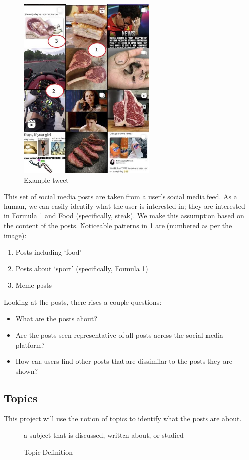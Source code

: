 \begin{figure}
    \centering
    \includegraphics[width=0.6\textwidth]{../images/tweet-example.png}
    \caption{Example tweet}
    \label{fig:motivation-example}
\end{figure}

This set of social media posts are taken from a user's social media feed. As a human, we can easily identify what the user is
interested in; they are interested in Formula 1 and Food (specifically, steak). We make this assumption based on the content
of the posts. Noticeable patterns in \cref{fig:motivation-example} are (numbered as per the image):
\begin{enumerate}
    \item Posts including `food'
    \item Posts about `sport' (specifically, Formula 1)
    \item Meme posts
\end{enumerate}

Looking at the posts, there rises a couple questions:
\begin{itemize}
    \item What are the posts about?
    \item Are the posts seen representative of all posts across the social media platform?
    \item How can users find other posts that are dissimilar to the posts they are shown?
\end{itemize}

\subsection{Topics}
This project will use the notion of topics to identify what the posts are about.
\begin{figure}[hbtp]
    \centering
    a subject that is discussed, written about, or studied
    \caption{Topic Definition - \cite{cambdict}}
    \label{fig:topic_definition}
\end{figure}

